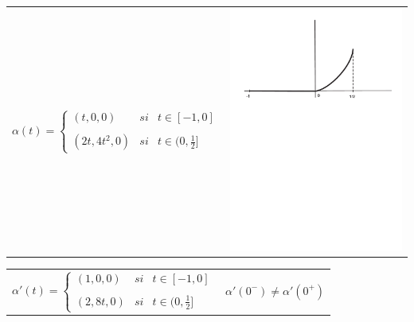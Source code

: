 \documentclass[ebook,oneside]{memoir}
\begin{document}
\begin{tabular}{cc}
$\alpha(t)=\left\{\begin{array}{ccc}
(t,0,0) & si & t\in [-1,0]\\
 & & \\
(2t,4t^2,0) & si & t\in (0, \frac{1}{2}]
\end{array}\right.$ &  \includegraphics[scale=0.2]{partes.pdf}
\end{tabular}

\vspace{0.3cm}

\begin{tabular}{cc}
$\alpha'(t)=\left\{\begin{array}{ccc}
(1,0,0) & si & t\in [-1,0]\\
 & & \\
(2,8t,0) & si & t\in (0, \frac{1}{2}]
\end{array}\right.$ & \hspace{1cm} $\alpha'(0^{-})\neq \alpha'(0^{+})$
\end{tabular}
\end{document}
